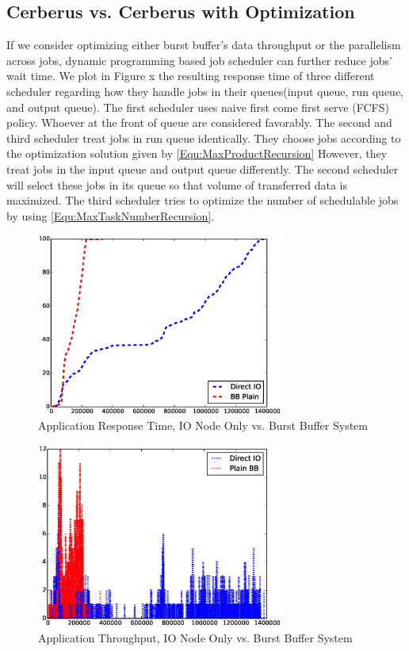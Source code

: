 \subsection{Cerberus vs. Cerberus with Optimization}
If we consider optimizing either burst buffer's data throughput or the parallelism across jobs,
dynamic programming based job scheduler can further reduce jobs' wait time.
We plot in Figure x the resulting response time of three different scheduler
regarding how they handle jobs in their queues(input queue, run queue, and output queue).
The first scheduler uses naive first come first serve (FCFS) policy.
Whoever at the front of queue are considered favorably.
The second and third scheduler treat jobs in run queue identically.
They choose jobs according to the optimization solution given by \ref{Equ:MaxProductRecursion}
However, they treat jobs in the input queue and output queue differently.
The second scheduler will select these jobs in its queue so that volume of transferred data is maximized.
The third scheduler tries to optimize the number of schedulable jobs by using \ref{Equ:MaxTaskNumberRecursion}.

\begin{figure}[!t]
\centering
\includegraphics[width=3.2in]{DrawDirectIOvsBB/1000jobs_direct_vs_bb_response}
\caption{Application Response Time, IO Node Only vs. Burst Buffer System}
\label{Fig:DirectIOvsBBResponseTime}
\end{figure}

\begin{figure}[!t]
\centering
\includegraphics[width=3.2in]{DrawDirectIOvsBB/1000jobs_direct_vs_bb_throughput}
\caption{Application Throughput, IO Node Only vs. Burst Buffer System}
\label{Fig:DirectIOvsBBThroughput}
\end{figure}


